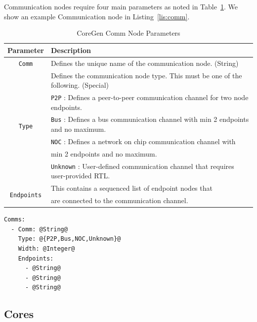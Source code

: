 \documentclass{article}
\begin{document}
Communication nodes require four main parameters as noted in Table~\ref{tab:CommParams}.  We show an example Communication 
node in Listing~\ref{lis:comm}.    

\begin{table}[h]
\begin{center}
\caption{CoreGen Comm Node Parameters}
\vspace{0.125in}
\label{tab:CommParams}
\begin{tabular}{|c|l|}
\hline
\textbf{Parameter} & \textbf{Description}\\
\hline
\texttt{Comm} & Defines the unique name of the communication node. (String)\\
\hline
\multirow{6}{*}{\texttt{Type}} & Defines the communication node type.  This must be one of the following. (Special)\\
                                                   & \texttt{P2P} : Defines a peer-to-peer communication channel for two node endpoints.\\
					    & \texttt{Bus} : Defines a bus communication channel with min 2 endpoints and no maximum.\\
					    & \texttt{NOC} : Defines a network on chip communication channel with\\
					    & min 2 endpoints and no maximum.\\
					    & \texttt{Unknown} : User-defined communication channel that requires user-provided RTL.\\
\hline
\multirow{2}{*}{\texttt{Endpoints}} & This contains a sequenced list of endpoint nodes that\\
                                                            & are connected to the communication channel.\\
\hline
\end{tabular}
\end{center}
\end{table}

\vspace{0.125in}
\begin{lstlisting}[frame=single,style=base,caption={Communication Node Definition},captionpos=b,label={lis:comm}]
Comms:
  - Comm: @String@
    Type: @{P2P,Bus,NOC,Unknown}@
    Width: @Integer@
    Endpoints:
      - @String@
      - @String@
      - @String@
\end{lstlisting}

\clearpage
\subsection{Cores}
\label{sec:CoreNodes}
\end{document}
